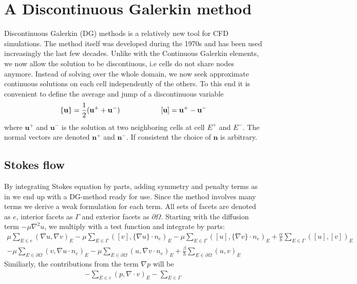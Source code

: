 \section{A Discontinuous Galerkin method}
Discontinuous Galerkin (DG) methods is a relatively new tool for CFD simulations. The method itself was developed during the 1970s and has been used increasingly the last few decades. Unlike with the Continuous Galerkin elements, we now allow the solution to be discontiuous, i.e cells do not share nodes anymore. Instead of solving over the whole domain, we now seek approximate continuous solutions on each cell independently of the others. To this end it is convenient to define the average and jump of a discontinuous variable
\begin{align} 
\{\mathbf{u}\} = \frac{1}{2}(\mathbf{u}^+ + \mathbf{u}^-) \hspace{2 cm}  [\mathbf{u}]  =  \mathbf{u}^+ - \mathbf{u}^- \label{Avg_jump}
\end{align}
where $\mathbf{u}^+$ and $\mathbf{u}^-$ is the solution at two neighboring cells at cell $E^+$ and $E^-$. The normal vectors are denoted $\mathbf{n}^+$ and $\mathbf{n}^-$. If consistent the choice of $\mathbf{n}$ is arbitrary. 
\subsection{Stokes flow}
By integrating Stokes equation by parts, adding symmetry and penalty terms as in \cite{Riviere2005} we end up with a DG-method ready for use. Since the method involves many terms we derive a weak formulation for each term. All sets of facets are denoted as $e$, interior facets as $\Gamma$ and exterior facets as $\partial \Omega$. Starting with the diffusion term $-\mu \nabla ^2 u$, we multiply with a test function and integrate by parts:
\begin{align}
	\mu \sum_{E \in e} (\nabla u, \nabla v)_E 
   -\mu \sum_{E \in \Gamma}([v], \{ \nabla u \} \cdot n_e)_E 
   -\mu \sum_{E \in \Gamma}([u], \{ \nabla v \} \cdot n_e)_E 
	+ \frac{\alpha}{h} \sum_{E \in \Gamma}([u],[v])_E \nonumber \\
	-\mu \sum_{E \in \partial \Omega}(v,  \nabla u \cdot n_e)_E 
   -\mu \sum_{E \in \partial \Omega}(u,  \nabla v  \cdot n_e)_E 
	+ \frac{\beta}{h} \sum_{E \in \partial \Omega}(u,v)_E 
 \label {Diffusion}
\end{align}
Similiarly, the contributions from the term $\nabla p$ will be
\begin{align}
	- \sum_{E \in e}(p, \nabla \cdot v)_E - \sum_{E \in \Gamma}
\end{align}
